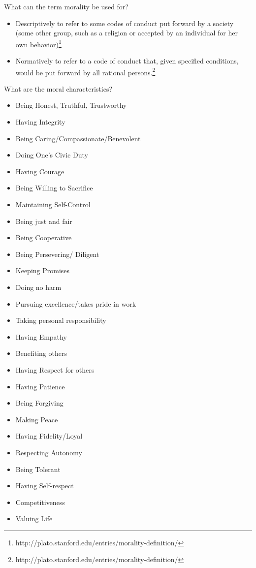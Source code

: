 \documentclass[11pt, oneside]{article}   	%
\begin{document}
\par What can the term morality be used for?
\begin{itemize}
	\item Descriptively to refer to some codes of conduct put forward by a society (some other group, such as a religion or accepted by an individual for her own behavior)\footnote{http://plato.stanford.edu/entries/morality-definition/}
	\item Normatively to refer to a code of conduct that, given specified conditions, would be put forward by all rational persons.\footnote{http://plato.stanford.edu/entries/morality-definition/}
\end{itemize}

\par What are the moral characteristics?
\begin{itemize}
	\item Being Honest, Truthful, Trustworthy
	\item Having Integrity
	\item Being Caring/Compassionate/Benevolent
	\item Doing One's Civic Duty
	\item Having Courage
	\item Being Willing to Sacrifice
	\item Maintaining Self-Control
	\item Being just and fair
	\item Being Cooperative
	\item Being Persevering/ Diligent
	\item Keeping Promises
	\item Doing no harm
	\item Pursuing excellence/takes pride in work
	\item Taking personal responsibility
	\item Having Empathy
	\item Benefiting others 
	\item Having Respect for others
	\item Having Patience
	\item Being Forgiving
	\item Making Peace
	\item Having Fidelity/Loyal
	\item Respecting Autonomy
	\item Being Tolerant
	\item Having Self-respect
	\item Competitiveness
	\item Valuing Life
\end{itemize}
\end{document}
